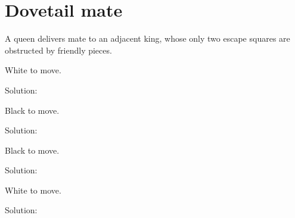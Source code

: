 \documentclass{book}
\begin{document}
\section{Dovetail mate}
A queen delivers mate to an adjacent king, whose only two escape squares are obstructed by friendly pieces.\begin{multicols}{2} 
\begin{samepage} 
\newgame 


 
\showboard
 
 White to move. 
 
Solution: 
 
\end{samepage}\begin{samepage} 
\newgame 


 
\showboard
 
 Black to move. 
 
Solution: 
 
\end{samepage}\begin{samepage} 
\newgame 


 
\showboard
 
 Black to move. 
 
Solution: 
 
\end{samepage}\begin{samepage} 
\newgame 


 
\showboard
 
 White to move. 
 
Solution: 
 
\end{samepage}\end{multicols} 
\newpage 
\end{document}

